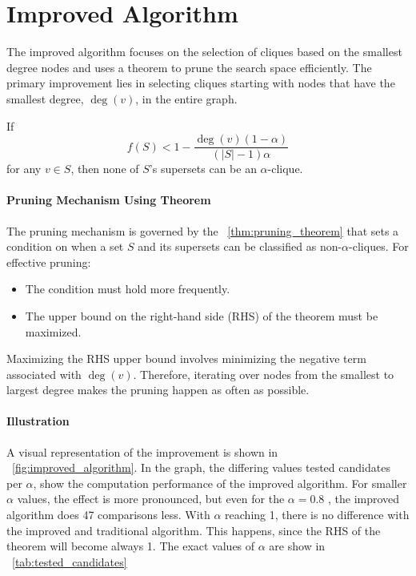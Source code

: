 \section{Improved Algorithm}

The improved algorithm focuses on the selection of cliques based on the smallest degree nodes and uses a theorem to prune the search space efficiently.
The primary improvement lies in selecting cliques starting with nodes that have the smallest degree, \( \deg(v) \), in the entire graph.

\begin{theorem}
    \label{thm:pruning_theorem} %
    If
    \[
        f(S) < 1 - \frac{\deg(v) (1 - \alpha)}{(|S| - 1) \alpha}
    \]
    for any \( v \in S \), then none of \( S \)'s supersets can be an \( \alpha \)-clique.
\end{theorem}

\paragraph{Pruning Mechanism Using Theorem}
The pruning mechanism is governed by the ~\autoref{thm:pruning_theorem} that sets a condition on when a set \( S \) and its supersets can be classified as non-\( \alpha \)-cliques. For effective pruning:
\begin{itemize}
    \item The condition must hold more frequently.
    \item The upper bound on the right-hand side (RHS) of the theorem must be maximized.
\end{itemize}
Maximizing the RHS upper bound involves minimizing the negative term associated with \( \deg(v) \). Therefore, iterating over nodes from the smallest to largest degree makes the pruning happen as often as possible.

\paragraph{Illustration}
A visual representation of the improvement is shown in  ~\autoref{fig:improved_algorithm}. In the graph, the differing values tested candidates per  \(\alpha\), show the computation performance of the improved algorithm. For smaller  \(\alpha\) values, the effect is more pronounced, but even for the  \(\alpha = 0.8\) , the improved algorithm does 47 comparisons less. With  \(\alpha\) reaching 1, there is no difference with the improved and traditional algorithm. This happens, since the RHS of the theorem will become always 1. The exact values of \(\alpha\) are show in ~\autoref{tab:tested_candidates}

